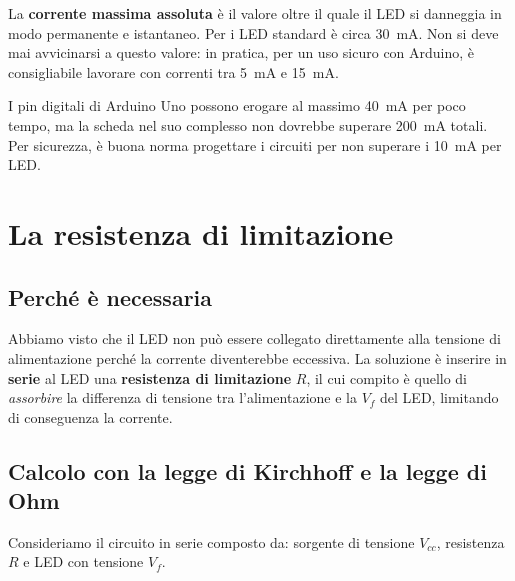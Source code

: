La \textbf{corrente massima assoluta} è il valore oltre il quale il LED si danneggia 
in modo permanente e istantaneo. Per i LED standard è circa \SI{30}{\milli\ampere}. 
Non si deve mai avvicinarsi a questo valore: in pratica, per un uso sicuro con Arduino, 
è consigliabile lavorare con correnti tra \SI{5}{\milli\ampere} e \SI{15}{\milli\ampere}.

\begin{tcolorbox}[colback=blue!4, colframe=blue!60, title=\textbf{Nota pratica}]
    I pin digitali di Arduino Uno possono erogare al massimo \SI{40}{\milli\ampere} per poco tempo, ma la scheda nel suo complesso non dovrebbe superare \SI{200}{\milli\ampere} totali. Per sicurezza, è buona norma progettare i circuiti per non superare i \SI{10}{\milli\ampere} per LED.
\end{tcolorbox}
















\section{La resistenza di limitazione}

\subsection*{Perché è necessaria}

Abbiamo visto che il LED non può essere collegato direttamente alla tensione di 
alimentazione perché la corrente diventerebbe eccessiva. La soluzione è inserire 
in \textbf{serie} al LED una \textbf{resistenza di limitazione} $R$, il cui compito 
è quello di \textit{assorbire} la differenza di tensione tra l'alimentazione e la 
$V_f$ del LED, limitando di conseguenza la corrente.

\subsection*{Calcolo con la legge di Kirchhoff e la legge di Ohm}

Consideriamo il circuito in serie composto da: sorgente di tensione $V_{cc}$, 
resistenza $R$ e LED con tensione $V_f$.

